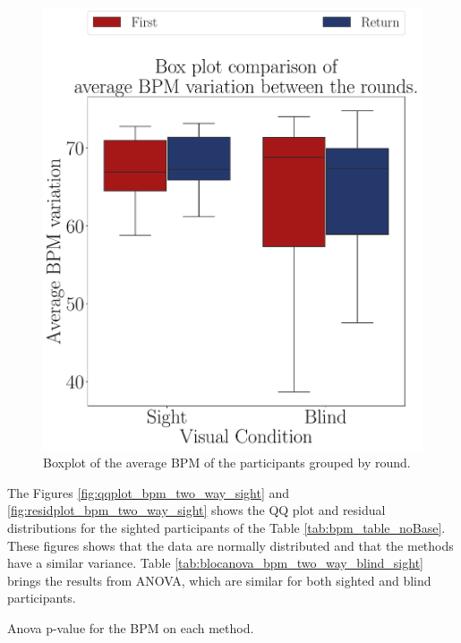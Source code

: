 \begin{figure}[!htb]
\begin{minipage}{0.45\textwidth}
        \includegraphics[width = \textwidth]{Resultados/ECG/Figuras/pdf/boxplot_ecg_bpm_4_rounds.pdf}
        \caption{Boxplot of the average BPM of the participants grouped by round.}
        \label{fig:boxplot_ecg_bpm_4_rounds}
    \end{minipage}
\end{figure}
 
%
%

The Figures \ref{fig:qqplot_bpm_two_way_sight} and \ref{fig:residplot_bpm_two_way_sight} shows the QQ plot and residual distributions for the sighted participants of the Table \ref{tab:bpm_table_noBase}. These figures shows that the data are normally distributed and that the methods have a similar variance. Table \ref{tab:blocanova_bpm_two_way_blind_sight} brings the results from ANOVA, which are similar for both sighted and blind participants.


\begin{table}[!htb]
    \caption{Anova p-value for the BPM on each method.}
    \label{tab:blocanova_bpm_two_way_blind_sight}
\begin{minipage}{0.45\textwidth}
    
\end{minipage}
\begin{minipage}{0.45\textwidth}
    
\end{minipage}
\end{table}

